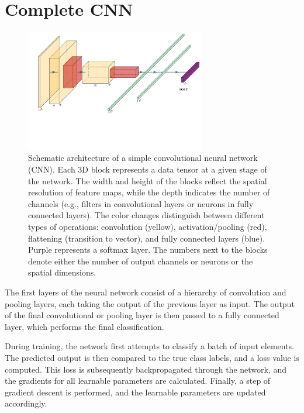 \documentclass{pracalicmgr}
\begin{document}
\section{Complete CNN}

\begin{figure}[H]
    \centering
    \includegraphics[width=0.7\textwidth]{src/lenet.pdf}
    \caption{Schematic architecture of a simple convolutional neural network (CNN). Each 3D block represents a data tensor at a given stage of the network. The width and height of the blocks reflect the spatial resolution of feature maps, while the depth indicates the number of channels (e.g., filters in convolutional layers or neurons in fully connected layers). The color changes distinguish between different types of operations: convolution (yellow), activation/pooling (red), flattening (transition to vector), and fully connected layers (blue). Purple represents a softmax layer. The numbers next to the blocks denote either the number of output channels or neurons or the spatial dimensions\cite{Iqbal2018PlotNeuralNet}.}
    \label{fig:cnn_architecture}
\end{figure}

The first layers of the neural network consist of a hierarchy of convolution and pooling layers, each taking the output of the previous layer as input. The output of the final convolutional or pooling layer is then passed to a fully connected layer, which performs the final classification.

During training, the network first attempts to classify a batch of input elements. The predicted output is then compared to the true class labels, and a loss value is computed. This loss is subsequently backpropagated through the network, and the gradients for all learnable parameters are calculated. Finally, a step of gradient descent is performed, and the learnable parameters are updated accordingly.
\end{document}
